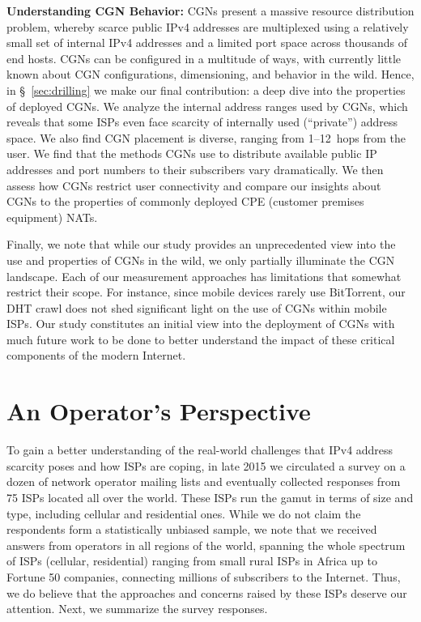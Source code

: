 \documentclass[10pt]{sig-alternate-05-2015}
\newcommand\xref[1]{\S~\ref{#1}}
\newcommand{\parax}[1]{\vspace{0.2em} \noindent \textbf{#1:}}
\begin{document}
\parax{Understanding CGN Behavior}
CGNs present a massive resource distribution problem, whereby scarce public 
IPv4 addresses are multiplexed using a relatively small set of internal IPv4 
addresses and a limited port space across thousands of end hosts. CGNs can be 
configured in a multitude of ways, with currently little known about CGN
configurations, 
dimensioning, and behavior in the wild. Hence, in \xref{sec:drilling} we
make our final
contribution: a deep dive into 
the properties of deployed CGNs. We analyze 
the internal address ranges used by CGNs, which reveals that some
ISPs even face scarcity of internally used (``private'') address space.  We 
also 
find CGN placement is diverse, ranging from
\mbox{1--12~hops}
from the user.  We find that the methods CGNs use to distribute
available public IP  
addresses and port numbers to their subscribers vary
dramatically.  We then assess how CGNs restrict user
connectivity and  
compare our insights about CGNs to the properties of commonly
deployed CPE (customer 
premises equipment) NATs.





Finally, we note that while our study provides an unprecedented view
into the use and properties of CGNs in the wild, we only partially
illuminate the CGN landscape.  Each of our measurement approaches has
limitations that somewhat restrict their scope.  For instance, since
mobile devices rarely use BitTorrent, our DHT crawl does not shed
significant light on the use of CGNs within mobile ISPs.  Our study
constitutes
an initial view into the deployment of CGNs with much future
work to be done to better understand the impact of these critical
components of the modern Internet.



\section{An Operator's Perspective}
\label{sec:ops}

To gain a better understanding of the real-world challenges that
IPv4 address scarcity poses and how ISPs are coping, in late 2015
we circulated a survey on a dozen of network operator mailing lists and 
eventually collected responses from 75 ISPs located all over the world.  These 
ISPs run the gamut in terms of size and type, including cellular and 
residential ones. While we do not claim the respondents form a statistically 
unbiased sample, we note that we received answers from operators in all regions 
of the world, spanning the whole spectrum of ISPs (cellular, residential) 
ranging from small rural ISPs in Africa up to Fortune 50 companies, connecting 
millions of subscribers to the Internet. Thus, we do believe that the 
approaches and concerns raised by these ISPs deserve our attention.  Next, we 
summarize the survey responses.
\end{document}
